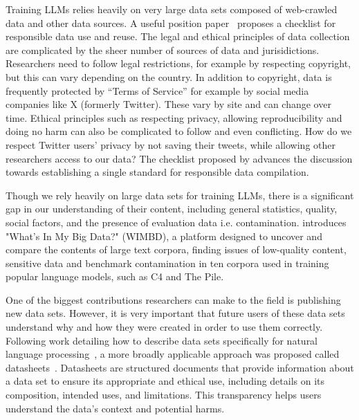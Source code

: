 \noindent Training LLMs relies heavily on very large data sets composed of web-crawled data and other data sources.  
A useful position paper~\cite{rogers_just_2021} proposes a checklist for responsible data use and reuse. 
The legal and ethical principles of data collection are complicated by the sheer number of sources of data and jurisidictions. Researchers need to follow legal restrictions, for example by respecting copyright, but this can vary depending on the country.
In addition to copyright, data is frequently protected by ``Terms of Service'' for example by social media companies like X (formerly Twitter). These vary by site and can change over time. Ethical principles such as respecting privacy, allowing reproducibility and doing no harm can also be complicated to follow and even conflicting. How do we respect Twitter users' privacy by not saving their tweets, while allowing other researchers access to our data? The checklist proposed by \citet{rogers_just_2021} advances the discussion towards establishing a single standard for responsible data compilation.

Though we rely heavily on large data sets for training LLMs, there is a significant gap in our understanding of their content, including general statistics, quality, social factors, and the presence of evaluation data i.e. contamination. \citet{elazar_whats_2024} introduces "What's In My Big Data?" (WIMBD), a platform designed to uncover and compare the contents of large text corpora, finding issues of low-quality content, sensitive data and benchmark contamination in ten corpora used in training popular language models, such as C4 and The Pile.
 
One of the biggest contributions researchers can make to the field is publishing new data sets. However, it is very important that future users of these data sets understand why and how they were created in order to use them correctly. Following work detailing how to describe data sets specifically for natural language processing~\cite{bender_data_2018}, a more broadly applicable approach was proposed called datasheets~\citep{gebru_datasheets_2020}. Datasheets are structured documents that provide information about a data set to ensure its appropriate and ethical use, including details on its composition, intended uses, and limitations. This transparency helps users understand the data's context and potential harms.



